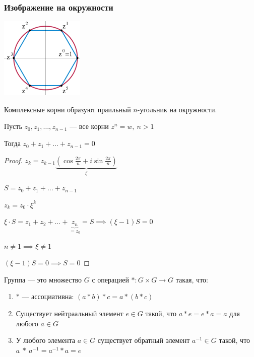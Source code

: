 \subsubsection*{Изображение на окружности}

\begin{center}
    \includegraphics[width=0.3\textwidth]{images/complexroot.png}
\end{center}

Комплексные корни образуют праильный $n$-угольник на окружности.

\begin{lemma}
    Пусть $z_0, z_1, \ldots, z_{n - 1}$ --- все корни $z^n = w,~n > 1$

    Тогда $z_0 + z_1 + \ldots + z_{n - 1} = 0$
\end{lemma}

\begin{proof}

    $z_k = z_{k - 1} \underbrace{\left( \cos \frac{2 \pi}{n} + i \sin \frac{2 \pi}{n} \right)}_{\xi}$

    $S = z_0 + z_1 + \ldots + z_{n - 1}$

    $z_k = z_0 \cdot \xi^k$

    $\xi \cdot S = z_1 + z_2 + \ldots + \underbrace{z_n}_{= z_0} = S \implies (\xi - 1) S = 0$

    $n \neq 1 \implies \xi \neq 1$ 
    
    $(\xi - 1)S = 0 \implies S = 0$
\end{proof}

\begin{defn}
    Группа --- это множество $G$ с операцией $*: G \times G \to G$ такая, что:
    
    \begin{enumerate}
        \item $*$ --- ассоциативна: $(a * b) * c = a * (b * c)$
        \item Существует нейтраальный элемент $e \in G$ такой, что $a * e = e * a = a$ для любого $a \in G$
        \item У любого элемента $a \in G$ существует обратный элемент $a^{-1} \in G$ такой, что $a~*~a^{-1} = a^{-1} * a = e$
    \end{enumerate}
\end{defn}

